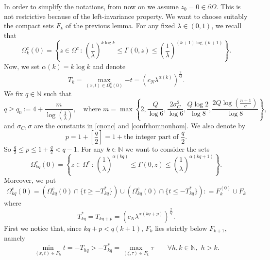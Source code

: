 \documentclass[10pt]{amsart}
\def \de {\partial}
\def \N {\mathbb{N}}
\def \O {\Omega}
\def \l {\lambda}
\def \Ockq {\O_{kq}^c(0)}
\def \Tst {T^*_{kq}}
\numberwithin{equation}{section}
\begin{document}
In order to simplify the notations, from now on we assume $z_0=0\in\de\Omega$. This is not restrictive because of the left-invariance property. We want to choose suitably the compact sets $F_k$ of the previous lemma. For any fixed $\l\in(0,1)$, we recall that
$$\O_{k}^c(0)=\left\{z \in \Omega^c \,:\,\left(\frac{1}{\l}\right)^{k\log{k}}\leq\Gamma(0,z) \leq\left(\frac{1}{\l}\right)^{(k+1)\log{(k+1)}}\right\}. $$
Now, we set $\alpha(k)=k\log{k}$ and  denote
$$T_k=\max_{(x,t)\in \O_{k}^c(0)}{-t}=\left(c_N\l^{\alpha(k)}\right)^{\frac{2}{Q}}.$$
We fix $q\in\N$ such that 
\begin{equation}\label{defq}
q\geq q_0:=4+\frac{m}{\log{\left(\frac{1}{\l}\right)}},\quad\mbox{where }m=\max{\left\{2,\frac{Q}{\log{6}},\frac{2\sigma_C^2}{\log{6}},\frac{Q\log{2}}{\log{8}},\frac{2Q\log{(\frac{n+1}{\sigma})}}{\log{8}}\right\}},
\end{equation}
and $\sigma_C, \sigma$ are the constants in \eqref{cnonc} and \eqref{confrhomnonhom}. We also denote by
$$p=1+\left[\frac{q}{2}\right]=1+\mbox{the integer part of }\frac{q}{2}.$$
So $\frac{q}{2}\leq p\leq 1 + \frac{q}{2} <q-1$. For any $k\in\N$ we want to consider the sets
$$\Ockq=\left\{z \in \Omega^c \,:\,\left(\frac{1}{\l}\right)^{\alpha(kq)}\leq\Gamma(0,z) \leq\left(\frac{1}{\l}\right)^{\alpha(kq+1)}\right\}.$$
Moreover, we put
\begin{equation}\label{defFk}
\Ockq=\left(\Ockq\cap \{t\geq -\Tst\}\right)\cup\left(\Ockq\cap \{t\leq -\Tst\}\right): =F_k^{(0)}\cup F_k
\end{equation}
where
$$\Tst=T_{kq+p}=\left(c_N\l^{\alpha(kq+p)}\right)^{\frac{2}{Q}}.$$
First we notice that, since $kq+p<q(k+1)$, $F_k$ lies strictly below $F_{k+1}$, namely
\begin{equation}\label{sotto}
\min_{(x,t)\in F_{h}}{t}=-T_{hq}>-\Tst=\max_{(\xi,\tau)\in F_{k}}{\tau}\qquad\forall h,k\in\N,\,\,h>k.
\end{equation}
 
\end{document}
